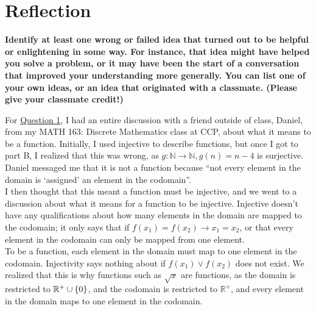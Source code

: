 \documentclass[article, 12pt]{article}
\theoremstyle{definition}
\DeclarePairedDelimiter\set{\{}{\}}
\newcommand{\unite}{\cup}
\newcommand{\reals}{\mathbb{R}} %
\newcommand{\nats}{\mathbb{N}}
\begin{document}
        \section{Reflection}
        \textbf{Identify at least one wrong or failed idea that turned out to be helpful or enlightening in some way. For instance, that idea might have helped you solve a problem, or it may have been the start of a conversation that improved your understanding more generally. You can list one of your own ideas, or an idea that originated with a classmate. (Please give your classmate credit!)}

        For \hyperref[q:1]{Question 1}, I had an entire discussion with a friend outside of class, Daniel, from my MATH 163: Discrete Mathematics class at CCP, about what it means to be a function. Initially, I used injective to describe functions, but once I got to part B, I realized that this was wrong, as $g: \nats \to \nats, g(n)=n-4$ is surjective. Daniel messaged me that it is not a function because ``not every element in the domain is `assigned' an element in the codomain''. 
        \\[12pt]
        I then thought that this meant a function must be injective, and we went to a discussion about what it means for a function to be injective. Injective doesn't have any qualifications about how many elements in the domain are mapped to the codomain; it only says that if $f(x_1) = f(x_2) \to x_1 = x_2$, or that every element in the codomain can only be mapped from one element. 
        \\[12pt]
        To be a function, each element in the domain must map to one element in the codomain. Injectivity says nothing about if $f(x_1) \lor f(x_2)$ does not exist. We realized that this is why functions such as $\sqrt{x}$ are functions, as the domain is restricted to $\reals^+ \unite \set*{0}$, and the codomain is restricted to $\reals^+$, and every element in the domain maps to one element in the codomain.
\end{document}
